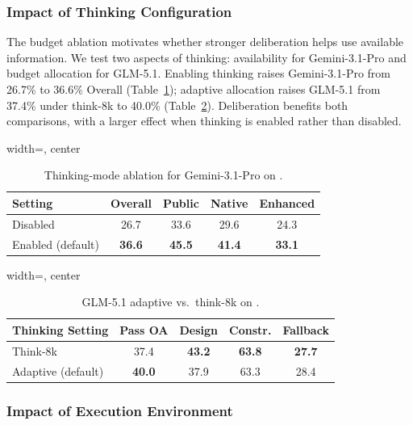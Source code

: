 \subsubsection{Impact of Thinking Configuration}
\label{sec:thinking}

The budget ablation motivates whether stronger deliberation helps use available information. We test two aspects of thinking: availability for Gemini-3.1-Pro and budget allocation for GLM-5.1. Enabling thinking raises Gemini-3.1-Pro from 26.7\% to 36.6\% Overall (Table~\ref{tab:thinking}); adaptive allocation raises GLM-5.1 from 37.4\% under think-8k to 40.0\% (Table~\ref{tab:glm-adaptive-think8k}). Deliberation benefits both comparisons, with a larger effect when thinking is enabled rather than disabled.

\begin{table}[t]
\centering
\caption{Thinking-mode ablation for Gemini-3.1-Pro on \rcblite{}.}
\label{tab:thinking}
\small
\begin{adjustbox}{width=\linewidth, center}
\begin{tabular}{lcccc}
\toprule
Setting & Overall & Public & Native & Enhanced \\
\midrule
Disabled & 26.7 & 33.6 & 29.6 & 24.3 \\
Enabled (default) & \textbf{36.6} & \textbf{45.5} & \textbf{41.4} & \textbf{33.1} \\
\bottomrule
\end{tabular}
\end{adjustbox}
\end{table}

\begin{table}[t]
\centering
\caption{GLM-5.1 adaptive vs.\ think-8k on \rcblite{}.}
\label{tab:glm-adaptive-think8k}
\small
\begin{adjustbox}{width=\linewidth, center}
\begin{tabular}{lcccc}
\toprule
Thinking Setting & Pass OA & Design & Constr. & Fallback \\
\midrule
Think-8k & 37.4 & \textbf{43.2} & \textbf{63.8} & \textbf{27.7} \\
Adaptive (default) & \textbf{40.0} & 37.9 & 63.3 & 28.4 \\
\bottomrule
\end{tabular}
\end{adjustbox}
\end{table}

\subsubsection{Impact of Execution Environment}
\label{sec:execution-environment}

